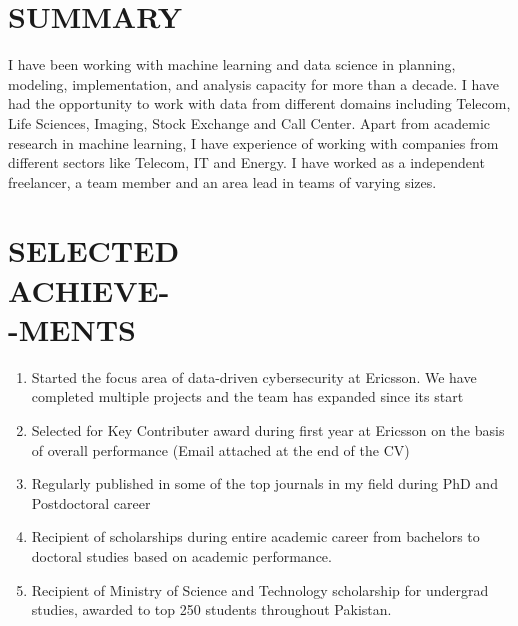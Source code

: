 \documentclass[margin, 10pt]{res} %
\begin{document}
\begin{resume}

 
\section{SUMMARY}
I have been working with machine learning and data science in planning, modeling, implementation, and analysis capacity for more than a decade. 
I have had the opportunity to work with data from different domains including Telecom, Life Sciences, Imaging, Stock Exchange and Call Center.
Apart from academic research in machine learning, I have experience of working with companies from different sectors like Telecom, IT and Energy.
I have worked as a independent freelancer, a team member and an area lead in teams of varying sizes.



\section{SELECTED \\ACHIEVE-\\-MENTS} 

\begin{enumerate}
 \item Started the focus area of data-driven cybersecurity at Ericsson. We have completed multiple projects and the team has expanded since its start
 \item Selected for Key Contributer award during first year at Ericsson on the basis of overall performance (Email attached at the end of the CV) 
 \item Regularly published in some of the top journals in my field during PhD and Postdoctoral career 
 \item Recipient of scholarships during entire academic career from bachelors to doctoral studies based on academic performance. 
 \item Recipient of Ministry of Science and Technology scholarship for undergrad studies, awarded to top 250 students throughout Pakistan.
\end{enumerate} 



\end{resume}
\end{document}
